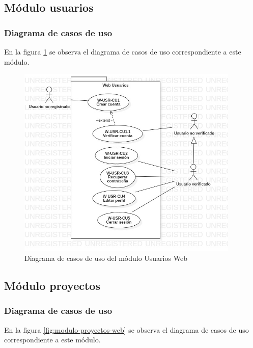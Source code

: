 \subsection{Módulo usuarios}
\subsubsection{Diagrama de casos de uso}
En la figura \ref{fig:modulo-usuarios-web} se observa el diagrama de casos de uso correspondiente a este módulo.

\begin{figure}[H]
    \centering
    \includegraphics[width=400px]{capitulo4/web/modulo-usuarios-web.jpg}
    \caption{Diagrama de casos de uso del módulo Usuarios Web}
    \label{fig:modulo-usuarios-web}
\end{figure}


\newpage

\newpage

\newpage

\newpage

\newpage

\newpage

\subsection{Módulo proyectos}
\subsubsection{Diagrama de casos de uso}
En la figura \ref{fig:modulo-proyectos-web} se observa el diagrama de casos de uso correspondiente a este módulo.

